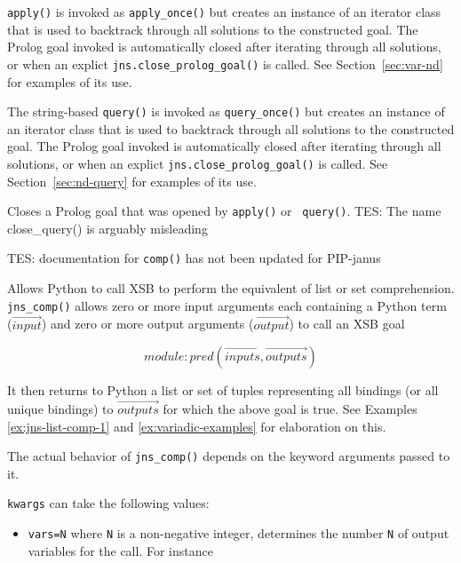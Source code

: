 \begin{description}
%
{\tt apply()} is invoked as {\tt apply\_once()} but creates an
instance of an iterator class that is used to backtrack through all
solutions to the constructed goal.  The Prolog goal invoked is
automatically closed after iterating through all solutions, or when an
explict {\tt jns.close\_prolog\_goal()} is called.  See
Section~\ref{sec:var-nd} for examples of its use.

%
The string-based {\tt query()} is invoked as {\tt query\_once()} but
creates an instance of an iterator class that is used to backtrack
through all solutions to the constructed goal.  The Prolog goal
invoked is automatically closed after iterating through all solutions,
or when an explict {\tt jns.close\_prolog\_goal()} is called.  See
Section~\ref{sec:nd-query} for examples of its use.

Closes a Prolog goal that was opened by {\tt apply()} or {\tt
  query()}.  {\sc TES: The name close\_query() is arguably misleading}

            {\sc TES: documentation for {\tt comp()} has not been
              updated for PIP-janus}
            
  Allows Python to call XSB to perform the equivalent of list or set
  comprehension.  {\tt jns\_comp()} allows zero or more input arguments
  each containing a Python term ($\overrightarrow{input}$) and zero or
  more output arguments ($\overrightarrow{output}$) to call an XSB goal

\[module:pred(\overrightarrow{inputs},\overrightarrow{outputs}) \]

It then returns to Python a list or set of tuples representing all
bindings (or all unique bindings) to $\overrightarrow{outputs}$ for
which the above goal is true.  See Examples \ref{ex:jns-list-comp-1}
and \ref{ex:variadic-examples} for elaboration on this.

The actual behavior of {\tt jns\_comp()} depends on the keyword
arguments passed to it.

{\tt kwargs} can take the following values:
\begin{itemize}
  \item {\tt vars=N} where {\tt N} is a non-negative integer,
    determines the number {\tt N} of output variables for the call.
    For instance
    

\end{itemize}
\end{description}

